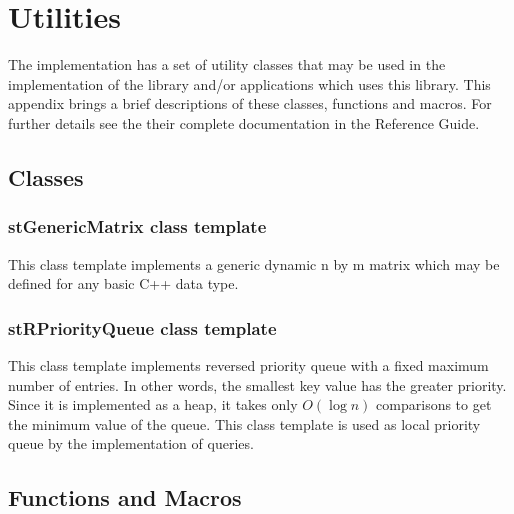 \chapter{Utilities}
\label{cha:utilities}

The \libname{ }implementation has a set of utility classes that may be used in the implementation of the library and/or applications which uses this library. This appendix brings a brief descriptions of these classes, functions and macros. For further details see the their complete documentation in the \libname{ } Reference Guide.

\section{Classes}

\subsection{stGenericMatrix class template}

This class template implements a generic dynamic n by m matrix which may be defined for any basic C++ data type. 

\subsection{stRPriorityQueue class template}

This class template implements reversed priority queue with a fixed maximum number of entries. In other words, the smallest key value has the greater priority. Since it is implemented as a heap, it takes only $O(\log n)$ comparisons to get the minimum value of the queue. This class template is used as local priority queue by the implementation of queries.

\section{Functions and Macros}


